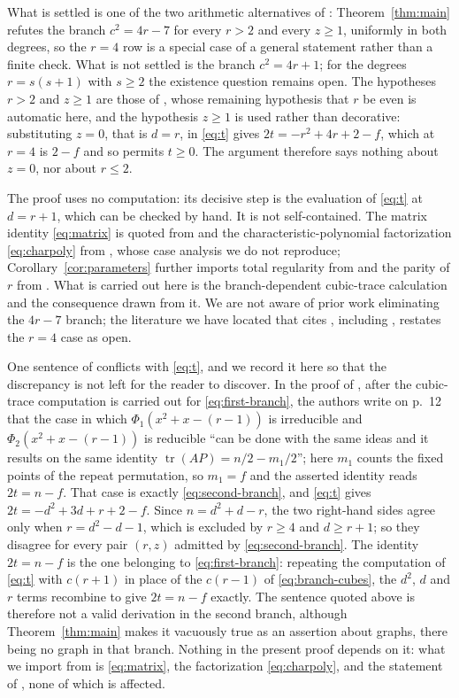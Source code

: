 \documentclass[11pt]{amsart}
\DeclareMathOperator{\tr}{tr}
\begin{document}
What is settled is one of the two arithmetic alternatives of
\cite[Theorem~2]{LM}: Theorem~\ref{thm:main} refutes the branch
$c^2=4r-7$ for every $r>2$ and every $z\geq 1$, uniformly in both
degrees, so the $r=4$ row is a special case of a general statement
rather than a finite check. What is not settled is the branch
$c^2=4r+1$; for the degrees $r=s(s+1)$ with $s\geq 2$ the existence
question remains open. The hypotheses $r>2$ and $z\geq 1$ are those
of \cite[Theorem~2]{LM}, whose remaining hypothesis that $r$ be even
is automatic here, and the hypothesis $z\geq 1$ is used rather than
decorative: substituting $z=0$, that is $d=r$, in \eqref{eq:t} gives
$2t=-r^2+4r+2-f$, which at $r=4$ is $2-f$ and so permits $t\geq 0$.
The argument therefore says nothing about $z=0$, nor about $r\leq 2$.

The proof uses no computation: its decisive step is the evaluation
of \eqref{eq:t} at $d=r+1$, which can be checked by hand. It is not
self-contained. The matrix identity \eqref{eq:matrix} is quoted from
\cite[Eq.~(1)]{LM} and the characteristic-polynomial factorization
\eqref{eq:charpoly} from \cite[proof of Theorem~2]{LM}, whose case
analysis we do not reproduce; Corollary~\ref{cor:parameters} further
imports total regularity from \cite[Theorem~2.8]{TE} and the parity
of $r$ from \cite[Proposition~1]{LM}. What is carried out here is the
branch-dependent cubic-trace calculation and the consequence drawn
from it. We are not aware of prior work eliminating the
$4r-7$ branch; the literature we have located that cites \cite{LM},
including \cite{DFL}, restates the $r=4$ case as open.

One sentence of \cite{LM} conflicts with \eqref{eq:t}, and we record it
here so that the discrepancy is not left for the reader to discover. In
the proof of \cite[Proposition~4]{LM}, after the cubic-trace computation
is carried out for \eqref{eq:first-branch}, the authors write on p.~12
that the case in which $\Phi_1\!\left(x^2+x-(r-1)\right)$ is irreducible
and $\Phi_2\!\left(x^2+x-(r-1)\right)$ is reducible ``can be done with
the same ideas and it results on the same identity
$\tr(AP)=n/2-m_1/2$''; here $m_1$ counts the fixed points of the repeat
permutation, so $m_1=f$ and the asserted identity reads $2t=n-f$. That
case is exactly \eqref{eq:second-branch}, and \eqref{eq:t} gives
$2t=-d^2+3d+r+2-f$. Since $n=d^2+d-r$, the two right-hand sides agree
only when $r=d^2-d-1$, which is excluded by $r\geq 4$ and $d\geq r+1$;
so they disagree for every pair $(r,z)$ admitted by
\eqref{eq:second-branch}. The identity $2t=n-f$ is the one belonging to
\eqref{eq:first-branch}: repeating the computation of \eqref{eq:t} with
$c(r+1)$ in place of the $c(r-1)$ of \eqref{eq:branch-cubes}, the
$d^2$, $d$ and $r$ terms recombine to give $2t=n-f$ exactly. The
sentence quoted above is therefore not a valid derivation in the second
branch, although Theorem~\ref{thm:main} makes it vacuously true as an
assertion about graphs, there being no graph in that branch. Nothing in
the present proof depends on it: what we import from \cite{LM} is
\eqref{eq:matrix}, the factorization \eqref{eq:charpoly}, and the
statement of \cite[Theorem~2]{LM}, none of which is affected.
\end{document}
